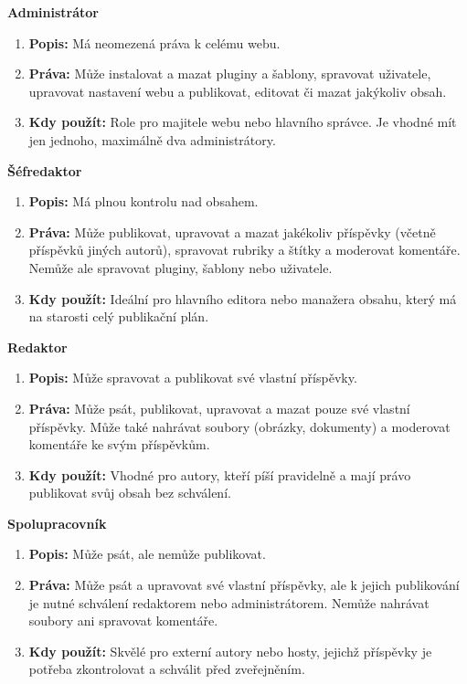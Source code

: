 \documentclass[12pt,a4paper]{article}
\begin{document}
	\newpage
	\textbf{Administrátor}
	\begin{enumerate}
	\item \textbf{Popis:} Má neomezená práva k celému webu.
	\item \textbf{Práva:} Může instalovat a mazat pluginy a šablony, spravovat uživatele, upravovat nastavení webu a publikovat, editovat či mazat jakýkoliv obsah.
	\item \textbf{Kdy použít:} Role pro majitele webu nebo hlavního správce. Je vhodné mít jen jednoho, maximálně dva administrátory.
	\end{enumerate}
	
	\textbf{Šéfredaktor}
	\begin{enumerate}
	\item \textbf{Popis:} Má plnou kontrolu nad obsahem.
	\item \textbf{Práva:} Může publikovat, upravovat a mazat jakékoliv příspěvky (včetně příspěvků jiných autorů), spravovat rubriky a štítky a moderovat komentáře. Nemůže ale spravovat pluginy, šablony nebo uživatele.
	\item \textbf{Kdy použít:} Ideální pro hlavního editora nebo manažera obsahu, který má na starosti celý publikační plán.
	\end{enumerate}
	
	\textbf{Redaktor}
	\begin{enumerate}
	\item \textbf{Popis:} Může spravovat a publikovat své vlastní příspěvky.
	\item \textbf{Práva:} Může psát, publikovat, upravovat a mazat pouze své vlastní příspěvky. Může také nahrávat soubory (obrázky, dokumenty) a moderovat komentáře ke svým příspěvkům.
	\item \textbf{Kdy použít:} Vhodné pro autory, kteří píší pravidelně a mají právo publikovat svůj obsah bez schválení.
	\end{enumerate}
	
	\textbf{Spolupracovník}
	\begin{enumerate}
	\item \textbf{Popis:} Může psát, ale nemůže publikovat.
	\item \textbf{Práva:} Může psát a upravovat své vlastní příspěvky, ale k jejich publikování je nutné schválení redaktorem nebo administrátorem. Nemůže nahrávat soubory ani spravovat komentáře.
	\item \textbf{Kdy použít:} Skvělé pro externí autory nebo hosty, jejichž příspěvky je potřeba zkontrolovat a schválit před zveřejněním.
	\end{enumerate}
	
\end{document}
